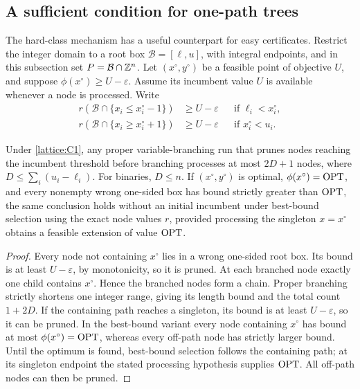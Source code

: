 \subsection{A sufficient condition for one-path trees}

The hard-class mechanism has a useful counterpart for easy certificates.
Restrict the integer domain to a root box $\mathcal B=[\ell,u]$, with
integral endpoints, and in this subsection set $P=\mathcal B\cap\mathbb{Z}^n$.
Let $(x^\circ,y^\circ)$ be a feasible point of objective $U$, and suppose
$\phi(x^\circ)\ge U-\varepsilon$. Assume its incumbent value $U$ is
available whenever a node is processed. Write
\begin{equation}
 \begin{aligned}
 r(\mathcal B\cap\{x_i\le x_i^\circ-1\})&\ge U-\varepsilon
       &&\text{if }\ell_i<x_i^\circ,\\
 r(\mathcal B\cap\{x_i\ge x_i^\circ+1\})&\ge U-\varepsilon
       &&\text{if }x_i^\circ<u_i.
 \end{aligned}
 \tag{C1}\label{lattice:C1}
\end{equation}

\begin{lemma}
\label{lattice:path}
Under \eqref{lattice:C1}, any proper variable-branching run that prunes
nodes reaching the incumbent threshold before branching processes at most
$2D+1$ nodes, where $D\le\sum_i(u_i-\ell_i)$. For binaries, $D\le n$.
If $(x^\circ,y^\circ)$ is optimal, $\phi(x^\circ)=\operatorname{OPT}$, and every
nonempty wrong one-sided box has bound strictly greater than $\operatorname{OPT}$, the
same conclusion holds without an initial incumbent under best-bound
selection using the exact node values $r$, provided processing the
singleton $x=x^\circ$ obtains a feasible extension of value $\operatorname{OPT}$.
\end{lemma}

\begin{proof}
Every node not containing $x^\circ$ lies in a wrong one-sided root box.
Its bound is at least $U-\varepsilon$, by monotonicity, so it is pruned.
At each branched node exactly one child contains $x^\circ$. Hence the
branched nodes form a chain. Proper branching strictly shortens one integer
range, giving its length bound and the total count $1+2D$. If the
containing path reaches a singleton, its bound is at least
$U-\varepsilon$, so it can be pruned. In the
best-bound variant every node containing $x^\circ$ has bound at most
$\phi(x^\circ)=\operatorname{OPT}$, whereas every off-path node has strictly larger
bound. Until the optimum is found, best-bound selection follows the
containing path; at its singleton endpoint the stated processing
hypothesis supplies $\operatorname{OPT}$. All off-path nodes can then be pruned.
\end{proof}

